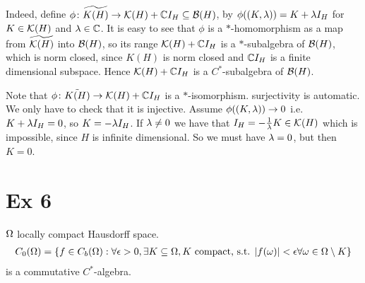 \documentclass[10pt,english,a4paper]{article}
\theoremstyle{definition}
\newcommand{\wt}[1]{\widetilde{ #1 }}
\begin{document}
Indeed, define $\phi\colon \widetilde{K(H)} \to \mathcal{K}(H) + \mathbb{C} I_{H} \subseteq \mathcal{B}(H)$,
by $\phi((K,\lambda)) = K + \lambda I_{H}$ for $K  \in \mathcal{K}(H)$ and $\lambda \in \mathbb{C}$.
It is easy to see that $\phi$ is a $*$-homomorphism as a map from 
$\wt{\Ks(H)}$ into $\mathcal{B}(H)$, so its range $\mathcal{K}(H) + \mathbb{C} I_{H}$ is a $*$-subalgebra
of $\mathcal{B}(H)$, which is norm closed, since $K(H)$ is norm closed and $\mathbb{C} I_{H}$
is a finite dimensional subspace. Hence $\mathcal{K}(H) + \mathbb{C} I_H$ is a $C^*$-subalgebra
of $\mathcal{B}(H)$.

Note that $\phi\colon \tilde{K(H)} \to \mathcal{K}(H) + \mathbb{C}  I_H$ is a $*$-isomorphism. 
surjectivity is automatic. We only have to check that it is injective. 
Assume $\phi((K,\lambda)) \to 0$ i.e. $K + \lambda I_{H} = 0$, so $K = -\lambda I_H$.
If $\lambda \neq 0$ we have that $I_H = -\tfrac{1}{\lambda}K  \in \mathcal{K}(H)$ which is impossible,
since $H$ is infinite dimensional. So we must have $\lambda = 0$, but then $K=0$. 


\section*{Ex 6}
$\Omega$ locally compact Hausdorff space. 
\begin{align*}
    C_{0}(\Omega) = \{ f \in C_b(\Omega) :\forall \epsilon >0, \exists K \subseteq \Omega, K \text{ compact, }\text{s.t. }|f(\omega)| < \epsilon \forall \omega \in \Omega \setminus K   \}
\end{align*}
is a commutative $C^*$-algebra. 
\end{document}
